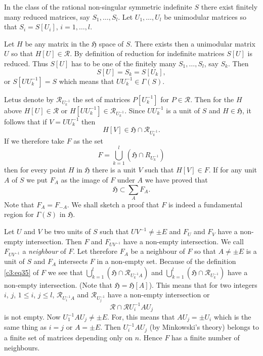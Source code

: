 In the class of the rational non-singular symmetric indefinite $S$
there exist finitely many reduced matrices, say
$S_{1},\ldots,S_{l}$. Let $U_{1},\ldots,U_{l}$ be unimodular matrices
so that $S_{i}=S[U_{i}]$, $i=1,\ldots,l$.

Let $H$ be any matrix in the $\mathfrak{H}$ space of $S$. There exists
then a unimodular matrix $U$ so that $H[U]\in\mathscr{R}$. By
definition of reduction for indefinite matrices $S[U]$ is
reduced. Thus $S[U]$ has to be one of the finitely many
$S_{1},\ldots,S_{l}$, say $S_{k}$. Then
$$
S[U]=S_{k}=S[U_{k}],
$$
or $S[UU^{-1}_{k}]=S$ which means that $UU^{-1}_{k}\in \Gamma(S)$.

Let\pageoriginale us denote by $\mathscr{R}_{U_{k}^{-1}}$ the set of
matrices $P[U^{-1}_{k}]$ for $P\in\mathscr{R}$. Then for the $H$ above
$H[U]\in\mathscr{R}$ or
$H[UU^{-1}_{k}]\in\mathscr{R}_{U_{k}^{-1}}$. Since $UU^{-1}_{k}$ is a
unit of $S$ and $H\in\mathfrak{H}$, it follows that if $V=UU^{-1}_{k}$
then 
$$
H[V]\in\mathfrak{H}\cap \mathscr{R}_{U_{k}^{-1}}.
$$
If we therefore take $F$ as the set
\begin{equation*}
F=\bigcup^{l}_{k=1}(\mathfrak{H}\cap R_{U_{k}^{-1}})\tag{35}\label{c3:eq35}
\end{equation*}
then for every point $H$ in $\mathfrak{H}$ there is a unit $V$ such
that $H[V]\in F$. If for any unit $A$ of $S$ we put $F_{A}$ as the
image of $F$ under $A$ we have proved that
$$
\mathfrak{H}\subset \sum_{A}F_{A}.
$$
Note that $F_{A}=F_{-A}$. We shall sketch a proof that $F$ is indeed a
fundamental region for $\Gamma(S)$ in $\mathfrak{H}$.

Let $U$ and $V$ be two units of $S$ such that $UV^{-1}\neq \pm E$ and
$F_{U}$ and $F_{V}$ have a non-empty intersection. Then $F$ and
$F_{UV^{-1}}$ have a non-empty intersection. We call $F_{UV^{-1}}$ a
{\em neighbour} of $F$. Let therefore $F_{A}$ be a neighbour of $F$ so
that $A\neq \pm E$ is a unit of $S$ and $F_{A}$ intersects $F$ in a
non-empty set. Because of the definition \eqref{c3:eq35} of $F$ we see that
$\bigcup\limits^{l}_{k=1}(\mathfrak{H}\cap \mathscr{R}_{U^{-1}_{k}A})$
and $\bigcup\limits^{l}_{k=1}(\mathfrak{H}\cap
\mathscr{R}_{U_{k}^{-1}})$ have a non-empty intersection. (Note that
$\mathfrak{H}=\mathfrak{H}[A]$). This means that for two integers $i$,
$j$, $1 \leq i$, $j  \leq l$, $\mathscr{R}_{U^{-1}_{i}A}$ and
$\mathscr{R}_{U^{-1}_{j}}$ have a non-empty intersection or 
$$
\mathscr{R}\cap \mathscr{R}U^{-1}_{i}AU_{j}
$$\pageoriginale
is not empty. Now $U^{-1}_{1}AU_{j}\neq \pm E$. For, this means that
$AU_{j}=\pm U_{i}$ which is the same thing as $i=j$ or $A=\pm E$. Then
$U^{-1}_{i}AU_{j}$ (by Minkowski's theory) belongs to a finite set of
matrices depending only on $n$. Hence $F$ has a finite number of
neighbours.

